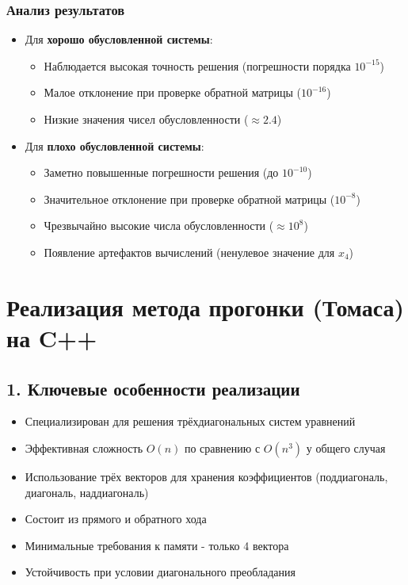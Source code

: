 \documentclass[12pt, a4paper]{article}
\begin{document}
\subsubsection*{Анализ результатов}
\begin{itemize}
\item Для \textbf{хорошо обусловленной системы}:
\begin{itemize}
\item Наблюдается высокая точность решения (погрешности порядка $10^{-15}$)
\item Малое отклонение при проверке обратной матрицы ($10^{-16}$)
\item Низкие значения чисел обусловленности ($\approx 2.4$)
\end{itemize}

\item Для \textbf{плохо обусловленной системы}:
\begin{itemize}
\item Заметно повышенные погрешности решения (до $10^{-10}$)
\item Значительное отклонение при проверке обратной матрицы ($10^{-8}$)
\item Чрезвычайно высокие числа обусловленности ($\approx 10^8$)
\item Появление артефактов вычислений (ненулевое значение для $x_4$)
\end{itemize}
\end{itemize}
\newpage
\section*{Реализация метода прогонки (Томаса) на C++}
\subsection*{1. Ключевые особенности реализации}

\begin{itemize}
\item Специализирован для решения трёхдиагональных систем уравнений
\item Эффективная сложность $O(n)$ по сравнению с $O(n^3)$ у общего случая
\item Использование трёх векторов для хранения коэффициентов (поддиагональ, диагональ, наддиагональ)
\item Состоит из прямого и обратного хода
\item Минимальные требования к памяти - только 4 вектора
\item Устойчивость при условии диагонального преобладания
\end{itemize}
\end{document}
